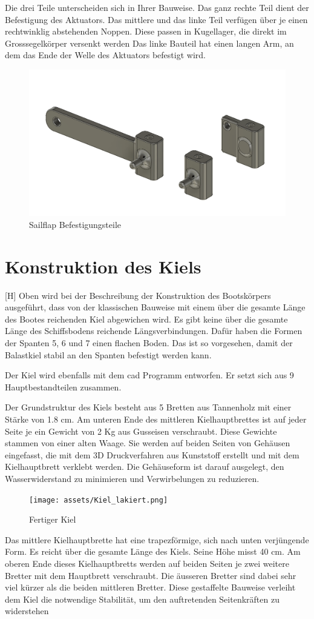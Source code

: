 Die drei Teile unterscheiden sich in Ihrer Bauweise. Das ganz rechte Teil dient der Befestigung des Aktuators. Das mittlere und das linke Teil verfügen über je einen rechtwinklig abstehenden Noppen. Diese passen in Kugellager, die direkt im Grosssegelkörper versenkt werden Das linke Bauteil hat einen langen Arm, an dem das Ende der Welle des Aktuators befestigt wird.

\begin{figure}[H]
    \centering
    \includegraphics[width=0.75\linewidth]{assets/sailflap_3d.png}
    \caption{Sailflap Befestigungsteile}
    \label{fig:sailflap}
\end{figure}

\section{Konstruktion des Kiels}[H]
Oben wird bei der Beschreibung der Konstruktion des Bootskörpers ausgeführt, dass von der klassischen Bauweise mit einem über die gesamte Länge des Bootes reichenden Kiel abgewichen wird. Es gibt keine über die gesamte Länge des Schiffsbodens reichende Längsverbindungen. Dafür haben die Formen der Spanten 5, 6 und 7 einen flachen Boden. Das ist so vorgesehen, damit der Balastkiel stabil an den Spanten befestigt werden kann.
 
Der Kiel wird ebenfalls mit dem \ac{cad} Programm entworfen. Er setzt sich aus 9 Hauptbestandteilen zusammen.

Der Grundstruktur des Kiels besteht aus 5 Bretten aus Tannenholz mit einer Stärke von 1.8 cm. Am unteren Ende des mittleren Kielhauptbrettes ist auf jeder Seite je ein Gewicht von 2 Kg aus Gusseisen verschraubt. Diese Gewichte stammen von einer alten Waage. Sie werden auf beiden Seiten von Gehäusen eingefasst, die mit dem 3D Druckverfahren aus Kunststoff erstellt und mit dem Kielhauptbrett verklebt werden. Die Gehäuseform ist darauf ausgelegt, den Wasserwiderstand zu minimieren und Verwirbelungen zu reduzieren. 
\begin{figure} 
    \centering
    \texttt{[image: assets/Kiel\_lakiert.png]}
    \caption{Fertiger Kiel}
    \label{fig:enter-label}
\end{figure}
Das mittlere Kielhauptbrette hat eine trapezförmige, sich nach unten verjüngende Form. Es reicht über die gesamte Länge des Kiels. Seine Höhe misst 40 cm. Am oberen Ende dieses Kielhauptbretts werden auf beiden Seiten je zwei weitere Bretter mit dem Hauptbrett verschraubt. Die äusseren Bretter sind dabei sehr viel kürzer als die beiden mittleren Bretter. Diese gestaffelte Bauweise verleiht dem Kiel die notwendige Stabilität, um den auftretenden Seitenkräften zu widerstehen

